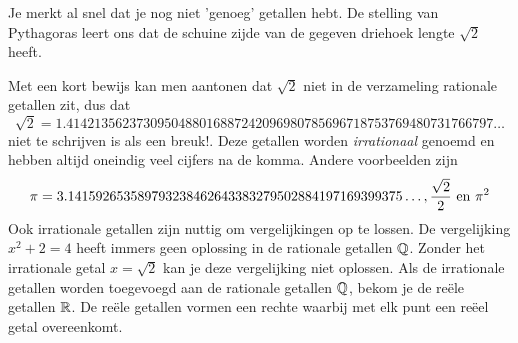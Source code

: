 \documentclass{ximera}
\begin{document}
Je merkt al snel dat je nog niet 'genoeg' getallen hebt. 
De stelling van Pythagoras 
leert ons dat de schuine zijde van de gegeven driehoek lengte \( \sqrt{2}\) heeft. 


\begin{wrapfigure}{r}{3cm} 
\end{wrapfigure}
    
Met een kort bewijs kan men aantonen dat \(\sqrt{2}\) niet in de verzameling rationale getallen zit, dus dat 
\[\sqrt{2} = 1.4142135623730950488016887242096980785696718753769480731766797\ldots%
\]  
niet te schrijven is als een breuk!. 
Deze getallen worden \textit{irrationaal} genoemd en hebben altijd oneindig veel cijfers na de komma.
%
Andere voorbeelden zijn 
\[ \pi = 3.141592653589793238462643383279502884197169399375\ldots%
,
\frac{\sqrt{2}}{2}
\Ten \pi^2 
\]
%
Ook irrationale getallen zijn nuttig om vergelijkingen op te lossen. 
De vergelijking \(x^2 + 2 = 4\) heeft immers geen oplossing in de rationale getallen \( \mathbb{Q} \).
Zonder het irrationale getal \(x = \sqrt{2} \) kan je deze vergelijking niet oplossen.
Als de irrationale getallen worden toegevoegd aan de rationale getallen \(\mathbb{Q}\), bekom je de reële getallen \(\mathbb{R}\). 
De reële getallen vormen een rechte waarbij met elk punt een reëel getal overeenkomt. 



    
    
\end{document}
